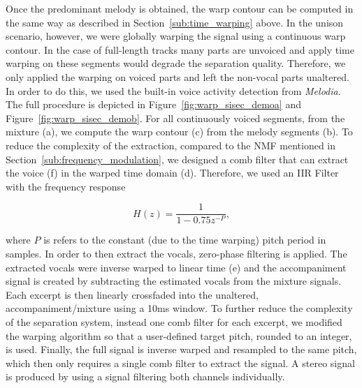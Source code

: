 Once the predominant melody is obtained, the warp contour can be computed in the same way as described in Section~\ref{sub:time_warping} above.
In the unison scenario, however, we were globally warping the signal using a continuous warp contour.
In the case of full-length tracks many parts are unvoiced and apply time warping on these segments would degrade the separation quality.
Therefore, we only applied the warping on voiced parts and left the non-vocal parts unaltered.
In order to do this, we used the built-in voice activity detection from \emph{Melodia}.
The full procedure is depicted in Figure~\ref{fig:warp_sisec_demoa} and Figure~\ref{fig:warp_sisec_demob}.
For all continuously voiced segments, from the mixture (a), we compute the warp contour (c) from the melody segments (b).
To reduce the complexity of the extraction, compared to the NMF mentioned in Section~\ref{sub:frequency_modulation}, we designed a comb filter that can extract the voice (f) in the warped time domain (d).
Therefore, we used an IIR Filter with the frequency response

\begin{equation}
  H(z) = \frac{1}{1 - 0.75z^{-P}},
\end{equation}

where \(P\) is refers to the constant (due to the time warping) pitch period in samples.
In order to then extract the vocals, zero-phase filtering is applied.
The extracted vocals were inverse warped to linear time (e) and the accompaniment signal is created by subtracting the estimated vocals from the mixture signals.
Each excerpt is then linearly crossfaded into the unaltered, accompaniment/mixture using a 10ms window.
To further reduce the complexity of the separation system, instead one comb filter for each excerpt, we modified the warping algorithm so that a user-defined target pitch, rounded to an integer, is used.
Finally, the full signal is inverse warped and resampled to the same pitch, which then only requires a single comb filter to extract the signal.
A stereo signal is produced by using a signal filtering both channels individually.

